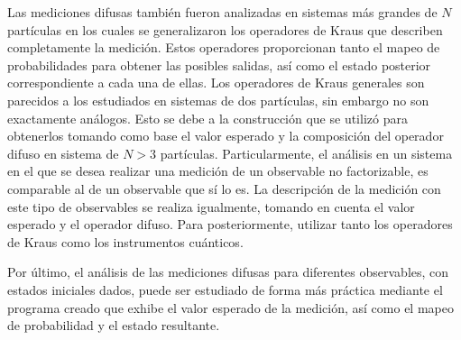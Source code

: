 Las mediciones difusas también fueron analizadas en sistemas más grandes de $N$ partículas en los cuales se generalizaron los operadores de Kraus que describen completamente la medición. Estos operadores proporcionan tanto el mapeo de probabilidades para obtener las posibles salidas, así como el estado posterior correspondiente a cada una de ellas. Los operadores de Kraus generales son parecidos a los estudiados en sistemas de dos partículas, sin embargo no son exactamente análogos. Esto se debe a la construcción que se utilizó para obtenerlos tomando como base el valor esperado y la composición del operador difuso en sistema de $N>3$ partículas. Particularmente, el análisis en un sistema en el que se desea realizar una medición de un observable no factorizable, es comparable al de un observable que sí lo es. La descripción de la medición con este tipo de observables se realiza igualmente, tomando en cuenta el valor esperado y el operador difuso. Para posteriormente, utilizar tanto los operadores de Kraus como los instrumentos cuánticos.


Por último, el análisis de las mediciones difusas para diferentes observables, con estados iniciales dados, puede ser estudiado de forma más práctica mediante el programa creado que exhibe el valor esperado de la medición, así como el mapeo de probabilidad y el estado resultante.